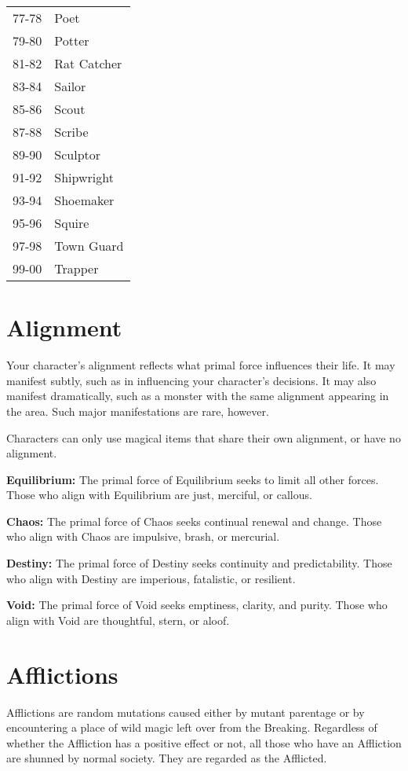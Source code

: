 \begin{multicols}{2}
\begin{center}
{\begin{xtabular}{|l|l|}
77-78 & Poet \\
79-80 & Potter \\
81-82 & Rat Catcher \\
83-84 & Sailor \\
85-86 & Scout \\
87-88 & Scribe \\
89-90 & Sculptor \\
91-92 & Shipwright \\
93-94 & Shoemaker \\
95-96 & Squire \\
97-98 & Town Guard \\
99-00 & Trapper \\
\hline
\end{xtabular}
}
\end{center}

\section{Alignment}

Your character's alignment reflects what primal force influences their life.
It may manifest subtly, such as in influencing your character's decisions.
It may also manifest dramatically, such as a monster with the same alignment
appearing in the area. Such major manifestations are rare, however.

Characters can only use magical items that share their own alignment, or have
no alignment.

\textbf{Equilibrium:} The primal force of Equilibrium seeks to limit all other
forces. Those who align with Equilibrium are just, merciful, or callous.

\textbf{Chaos:} The primal force of Chaos seeks continual renewal and change. Those
who align with Chaos are impulsive, brash, or mercurial.

\textbf{Destiny:} The primal force of Destiny seeks continuity and predictability.
Those who align with Destiny are imperious, fatalistic, or resilient.

\textbf{Void:} The primal force of Void seeks emptiness, clarity, and purity. Those
who align with Void are thoughtful, stern, or aloof.

\section{Afflictions}

Afflictions are random mutations caused either by mutant parentage or by
encountering a place of wild magic left over from the Breaking. Regardless
of whether the Affliction has a positive effect or not, all those who have
an Affliction are shunned by normal society. They are regarded as the
Afflicted.


\end{multicols}
